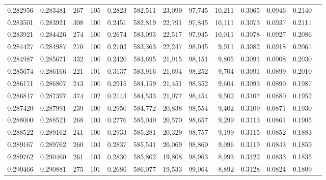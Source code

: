 \begin{tabular}{rrrrrrrrrrrrr}
0.282956 & 0.283481 &   267 & 105 &                                     0.2823 & 582,511 &  23,099 &  97,745 &  10,211 & 0.3065 & 0.0946 & 0.2140 \\
0.283501 & 0.283921 &   308 & 100 &                                     0.2451 & 582,819 &  22,791 &  97,845 &  10,111 & 0.3073 & 0.0937 & 0.2111 \\
0.283921 & 0.284426 &   274 & 100 &                                     0.2674 & 583,093 &  22,517 &  97,945 &  10,011 & 0.3078 & 0.0927 & 0.2086 \\
0.284427 & 0.284987 &   270 & 100 &                                     0.2703 & 583,363 &  22,247 &  98,045 &   9,911 & 0.3082 & 0.0918 & 0.2061 \\
0.284987 & 0.285671 &   332 & 106 &                                     0.2420 & 583,695 &  21,915 &  98,151 &   9,805 & 0.3091 & 0.0908 & 0.2030 \\
0.285674 & 0.286166 &   221 & 101 &                                     0.3137 & 583,916 &  21,694 &  98,252 &   9,704 & 0.3091 & 0.0899 & 0.2010 \\
0.286171 & 0.286807 &   243 & 100 &                                     0.2915 & 584,159 &  21,451 &  98,352 &   9,604 & 0.3093 & 0.0890 & 0.1987 \\
0.286817 & 0.287397 &   374 & 102 &                                     0.2143 & 584,533 &  21,077 &  98,454 &   9,502 & 0.3107 & 0.0880 & 0.1952 \\
0.287420 & 0.287991 &   239 & 100 &                                     0.2950 & 584,772 &  20,838 &  98,554 &   9,402 & 0.3109 & 0.0871 & 0.1930 \\
0.288000 & 0.288521 &   268 & 103 &                                     0.2776 & 585,040 &  20,570 &  98,657 &   9,299 & 0.3113 & 0.0861 & 0.1905 \\
0.288522 & 0.289162 &   241 & 100 &                                     0.2933 & 585,281 &  20,329 &  98,757 &   9,199 & 0.3115 & 0.0852 & 0.1883 \\
0.289167 & 0.289762 &   260 & 103 &                                     0.2837 & 585,541 &  20,069 &  98,860 &   9,096 & 0.3119 & 0.0843 & 0.1859 \\
0.289762 & 0.290460 &   261 & 103 &                                     0.2830 & 585,802 &  19,808 &  98,963 &   8,993 & 0.3122 & 0.0833 & 0.1835 \\
0.290466 & 0.290881 &   275 & 101 &                                     0.2686 & 586,077 &  19,533 &  99,064 &   8,892 & 0.3128 & 0.0824 & 0.1809 \\

\end{tabular}
